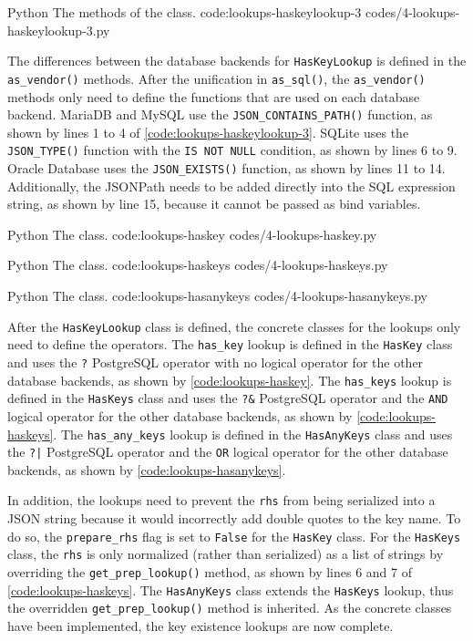 \listing
{Python}
{The  methods of the  class.}
{code:lookups-haskeylookup-3}
{codes/4-lookups-haskeylookup-3.py}

The differences between the database backends for \verb|HasKeyLookup| is
defined in the \verb|as_vendor()| methods. After the unification in
\verb|as_sql()|, the \verb|as_vendor()| methods only need to define the
functions that are used on each database backend. MariaDB and MySQL use the
\verb|JSON_CONTAINS_PATH()| function, as shown by lines 1 to 4 of
\autoref{code:lookups-haskeylookup-3}. SQLite uses the \verb|JSON_TYPE()|
function with the \verb|IS NOT NULL| condition, as shown by lines 6 to 9.
Oracle Database uses the \verb|JSON_EXISTS()| function, as shown by lines 11 to
14. Additionally, the JSONPath needs to be added directly into the SQL
expression string, as shown by line 15, because it cannot be passed as bind
variables.

\listing
{Python}
{The  class.}
{code:lookups-haskey}
{codes/4-lookups-haskey.py}

\listing
{Python}
{The  class.}
{code:lookups-haskeys}
{codes/4-lookups-haskeys.py}

\listing
{Python}
{The  class.}
{code:lookups-hasanykeys}
{codes/4-lookups-hasanykeys.py}

After the \verb|HasKeyLookup| class is defined, the concrete classes for the
lookups only need to define the operators. The \verb|has_key| lookup is defined
in the \verb|HasKey| class and uses the \verb|?| PostgreSQL operator with no
logical operator for the other database backends, as shown by
\autoref{code:lookups-haskey}. The \verb|has_keys| lookup is defined in the
\verb|HasKeys| class and uses the \verb|?&| PostgreSQL operator and the
\verb|AND| logical operator for the other database backends, as shown by
\autoref{code:lookups-haskeys}. The \verb|has_any_keys| lookup is defined in
the \verb|HasAnyKeys| class and uses the \verb=?|= PostgreSQL operator and the
\verb|OR| logical operator for the other database backends, as shown by
\autoref{code:lookups-hasanykeys}.

In addition, the lookups need to prevent the \verb|rhs| from being serialized
into a JSON string because it would incorrectly add double quotes to the key
name. To do so, the \verb|prepare_rhs| flag is set to \verb|False| for the
\verb|HasKey| class. For the \verb|HasKeys| class, the \verb|rhs| is only
normalized (rather than serialized) as a list of strings by overriding the
\verb|get_prep_lookup()| method, as shown by lines 6 and 7 of
\autoref{code:lookups-haskeys}. The \verb|HasAnyKeys| class extends the
\verb|HasKeys| lookup, thus the overridden \verb|get_prep_lookup()| method is
inherited. As the concrete classes have been implemented, the key existence
lookups are now complete.

